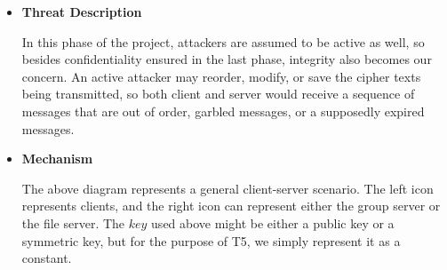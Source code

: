 \documentclass[letterpaper,11pt]{article}
\newlength{\arrow}
\begin{document}
\begin{itemize}[noitemsep,topsep=0pt,parsep=1pt,partopsep=1pt]
	\item\textbf{Threat Description}
	\begin{flushleft}
		In this phase of the project, attackers are assumed to be active as well, so besides confidentiality ensured in the last phase, integrity also becomes our concern. An active attacker may reorder, modify, or save the cipher texts being transmitted, so both client and server would receive a sequence of messages that are out of order, garbled messages, or a supposedly expired messages.   
	\end{flushleft}
	\item\textbf{Mechanism}
	\\\vspace{0.35in}
	\begin{flushleft}
		The above diagram represents a general client-server scenario. The left icon represents clients, and the right icon can represent either the group server or the file server. The $key$ used above might be either a public key or a symmetric key, but for the purpose of T5, we simply represent it as a constant. 
	\end{flushleft}
	\begin{flushleft}

\end{flushleft}
\end{itemize}
\end{document}
